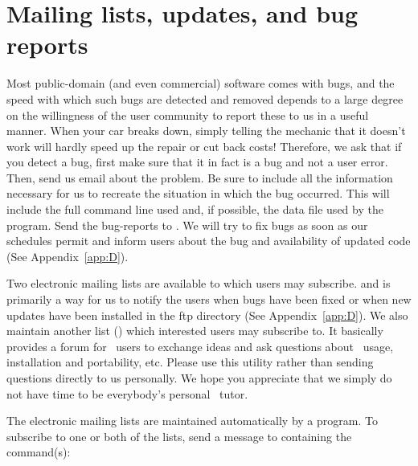 %
%
\chapter{Mailing lists, updates, and bug reports}
\label{ch:9}
\thispagestyle{headings}

Most public-domain (and even commercial) software comes
with bugs, and the speed with which such bugs are detected
and removed depends to a large degree on the willingness
of the user community to report these to us in a useful
manner.  When your car breaks down, simply telling the
mechanic that it doesn't work will hardly speed up the
repair or cut back costs!  Therefore, we ask that if
you detect a bug, first make sure that it in fact is a
bug and not a user error.  Then, send us email about the
problem.  Be sure to include all the information necessary
for us to recreate the situation in which the bug occurred.
This will include the full command line used and, if
possible, the data file used by the program.  Send the
bug-reports to
.
We will try to fix bugs as soon as our schedules permit and
inform users about the bug and availability of updated code
(See Appendix~\ref{app:D}).

Two electronic mailing lists are available to which
users may subscribe. 
and is primarily a way for us to notify the users when bugs
have been fixed or when new updates have been installed in
the ftp directory (See Appendix~\ref{app:D}).  We also maintain another list
() which interested users may
subscribe to.  It basically provides a forum for \GMT\ users
to exchange ideas and ask questions about \GMT\ usage,
installation and portability, etc. Please use this utility
rather than sending questions directly to us personally.
We hope you appreciate that we simply do not have time to be
everybody's personal \GMT\ tutor.

The electronic mailing lists are maintained automatically
by a program.  To subscribe to one or both of the lists,
send a message to
containing the command(s):

